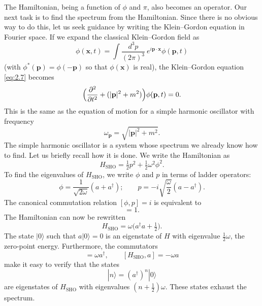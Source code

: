 The Hamiltonian, being a function of $\phi$ and $\pi$, also becomes an
operator.  Our next task is to find the spectrum from the Hamiltonian.
Since there is no obvious way to do this, let us seek guidance by writing
the Klein--Gordon equation in Fourier space.  If we expand the classical
Klein--Gordon field as
\begin{equation}
  \phi(\mathbf{x}, t) = \int \frac{d^3p}{(2\pi)^3}\ e^{i\mathbf{p}\cdot\mathbf{x}}
    \phi(\mathbf{p}, t)
\end{equation}
(with $\phi^{*}(\mathbf{p}) = \phi(-\mathbf{p})$ so that $\phi(\mathbf{x})$
is real), the Klein--Gordon equation \eqref{eq:2.7} becomes
\begin{equation}
  \Bigl( \frac{\partial^2}{\partial t^2}
    + (|\mathbf{p}|^2 + m^2) \Bigr)\phi(\mathbf{p}, t) = 0 .
  \label{eq:2.21}
\end{equation}
This is the same as the equation of motion for a simple harmonic oscillator
with frequency
\begin{equation}
  \omega_{\mathbf{p}} = \sqrt{|\mathbf{p}|^2 + m^2}.
  \label{eq:2.22}
\end{equation}
The simple harmonic oscillator is a system whose spectrum we already know
how to find.  Let us briefly recall how it is done.  We write the
Hamiltonian as
\begin{equation}
  H_{\mathrm{SHO}} = \tfrac{1}{2}p^2 + \tfrac{1}{2}\omega^2\phi^2 .
\end{equation}
To find the eigenvalues of $H_{\mathrm{SHO}}$, we write $\phi$ and $p$ in
terms of ladder operators:
\begin{equation}
  \phi = \frac{1}{\sqrt{2\omega}}(a + a^\dagger);\qquad
  p = -i\sqrt{\frac{\omega}{2}}(a - a^\dagger) .
  \label{eq:2.23}
\end{equation}
The canonical commutation relation $[\phi, p] = i$ is equivalent to
\begin{equation}
  [a, a^\dagger] = 1.
  \label{eq:2.24}
\end{equation}
The Hamiltonian can now be rewritten
\begin{equation}
  H_{\mathrm{SHO}} = \omega\bigl( a^\dagger a + \tfrac{1}{2} \bigr).
\end{equation}
The state $|0\rangle$ such that $a|0\rangle = 0$ is an eigenstate of $H$
with eigenvalue $\tfrac{1}{2}\omega$, the zero-point energy.  Furthermore,
the commutators
\begin{equation}
  [H_{\mathrm{SHO}}, a^\dagger] = \omega a^\dagger,
  \qquad [H_{\mathrm{SHO}}, a] = -\omega a
\end{equation}
make it easy to verify that the states
\begin{equation}
  |n\rangle = (a^\dagger)^n |0\rangle
\end{equation}
are eigenstates of $H_{\mathrm{SHO}}$ with eigenvalues $(n+\tfrac{1}{2})
\omega$.  These states exhaust the spectrum.

